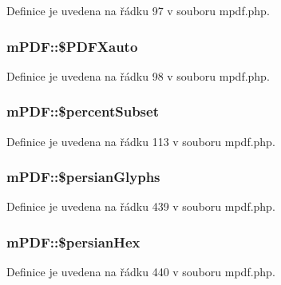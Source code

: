 Definice je uvedena na řádku 97 v souboru mpdf.\-php.

\hypertarget{classm_p_d_f_abe9713f3c6bc0322fed493f2db9c7535}{
\subsubsection[{\$\-P\-D\-F\-Xauto}]{\setlength{\rightskip}{0pt plus 5cm}m\-P\-D\-F\-::\$\-P\-D\-F\-Xauto}}\label{classm_p_d_f_abe9713f3c6bc0322fed493f2db9c7535}


Definice je uvedena na řádku 98 v souboru mpdf.\-php.

\hypertarget{classm_p_d_f_adabe2a77b8b954582da29ceb5c64e826}{
\subsubsection[{\$percent\-Subset}]{\setlength{\rightskip}{0pt plus 5cm}m\-P\-D\-F\-::\$percent\-Subset}}\label{classm_p_d_f_adabe2a77b8b954582da29ceb5c64e826}


Definice je uvedena na řádku 113 v souboru mpdf.\-php.

\hypertarget{classm_p_d_f_adac8cb7653c5bb746190d6f78427ad09}{
\subsubsection[{\$persian\-Glyphs}]{\setlength{\rightskip}{0pt plus 5cm}m\-P\-D\-F\-::\$persian\-Glyphs}}\label{classm_p_d_f_adac8cb7653c5bb746190d6f78427ad09}


Definice je uvedena na řádku 439 v souboru mpdf.\-php.

\hypertarget{classm_p_d_f_a437a1250db33367c60eedfed9609348b}{
\subsubsection[{\$persian\-Hex}]{\setlength{\rightskip}{0pt plus 5cm}m\-P\-D\-F\-::\$persian\-Hex}}\label{classm_p_d_f_a437a1250db33367c60eedfed9609348b}


Definice je uvedena na řádku 440 v souboru mpdf.\-php.


